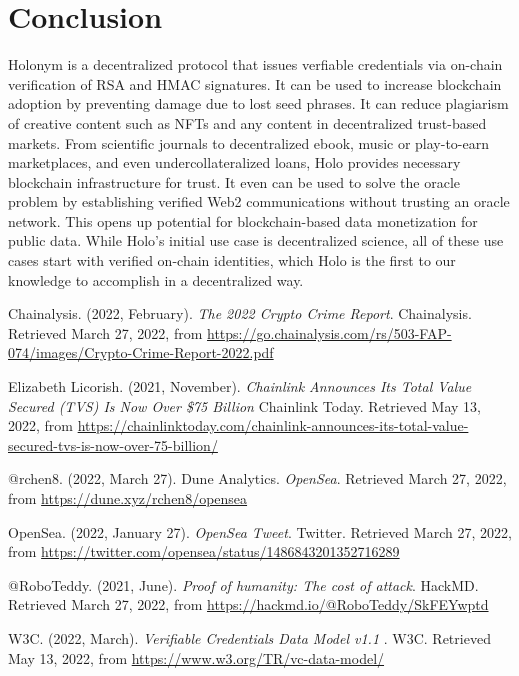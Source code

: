 \documentclass[11pt,oneside,a4paper]{article}
\begin{document}
	\section*{Conclusion}
		Holonym is a decentralized protocol that issues verfiable credentials via  on-chain verification of RSA and HMAC signatures. It can be used to increase blockchain adoption by preventing damage due to lost seed phrases. It can reduce plagiarism of creative content such as NFTs and any content in decentralized trust-based markets. From scientific journals to decentralized ebook, music or play-to-earn marketplaces, and even undercollateralized loans, Holo provides necessary blockchain infrastructure for trust. It even can be used to solve the oracle problem by establishing verified Web2 communications without trusting an oracle network. This opens up potential for blockchain-based data monetization for public data. While Holo's initial use case is decentralized science, all of these use cases start with verified on-chain identities, which Holo is the first to our knowledge to accomplish in a decentralized way.

\begin{thebibliography}{9}
	 Chainalysis. (2022, February). \textit{The 2022 Crypto Crime Report}. Chainalysis. Retrieved March 27, 2022, from \url{https://go.chainalysis.com/rs/503-FAP-074/images/Crypto-Crime-Report-2022.pdf}
	
	 Elizabeth Licorish. (2021, November). \textit{Chainlink Announces Its Total Value Secured (TVS) Is Now Over \$75 Billion} Chainlink Today. Retrieved May 13, 2022, from \url{https://chainlinktoday.com/chainlink-announces-its-total-value-secured-tvs-is-now-over-75-billion/}
	
	 @rchen8. (2022, March 27). Dune Analytics. \textit{OpenSea}. Retrieved March 27, 2022, from \url{https://dune.xyz/rchen8/opensea}
	
	 OpenSea. (2022, January 27). \textit{OpenSea Tweet}. Twitter. Retrieved March 27, 2022, from \url{https://twitter.com/opensea/status/1486843201352716289}
	
	 @RoboTeddy. (2021, June). \textit{Proof of humanity: The cost of attack}. HackMD. Retrieved March 27, 2022, from  \url{https://hackmd.io/@RoboTeddy/SkFEYwptd}
	
     W3C. (2022, March). \textit{Verifiable Credentials Data Model v1.1
}. W3C. Retrieved May 13, 2022, from  \url{https://www.w3.org/TR/vc-data-model/}	

\end{thebibliography}
\end{document}
